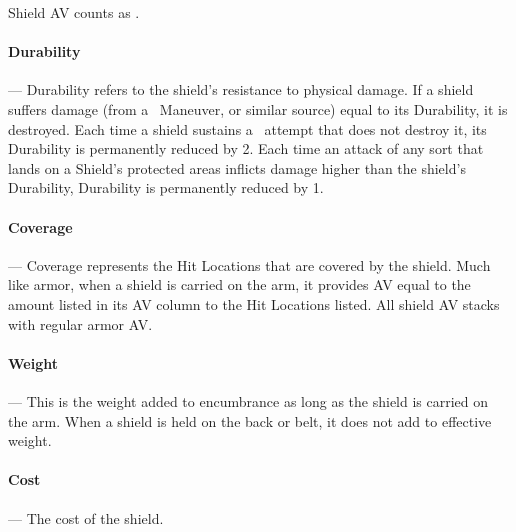 \documentclass[oneside,11pt,english]{book}
\begin{document}
Shield AV counts as .

\vspace{-10pt}\paragraph{Durability}---\quad
Durability refers to the shield’s resistance to physical damage. If a shield
suffers damage (from a ~Maneuver, or similar source) equal to
its Durability, it is destroyed. Each time a shield sustains a
~attempt that does not destroy it, its Durability is
permanently reduced by 2. Each time an attack of any sort that lands on a
Shield’s protected areas inflicts damage higher than the shield's Durability,
Durability is permanently reduced by 1. 

\vspace{-10pt}\paragraph{Coverage} ---\quad
Coverage represents the Hit Locations that are covered by the shield. Much like armor, when a shield is 
carried on the arm, it provides AV equal to the amount listed in its AV column to the Hit Locations listed. 
All shield AV stacks with regular armor AV. 

\vspace{-10pt}\paragraph{Weight}---\quad
This is the weight added to encumbrance as long as the shield is carried on the arm. When a shield is held 
on the back or belt, it does not add to effective weight. 

\vspace{-10pt}\paragraph{Cost}---\quad
The cost of the shield.
\newpage
\end{document}
